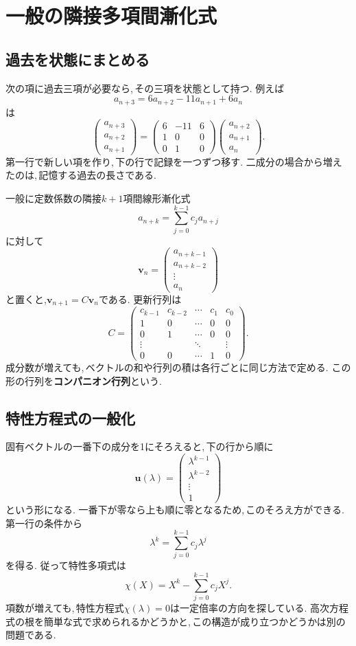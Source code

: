 \section{一般の隣接多項間漸化式}\label{節：一般の隣接多項間漸化式}
\subsection{過去を状態にまとめる}

次の項に過去三項が必要なら,\,その三項を状態として持つ.
例えば
\[
 a_{n+3}=6a_{n+2}-11a_{n+1}+6a_n
\]
は
\[
 \begin{pmatrix}a_{n+3}\\a_{n+2}\\a_{n+1}\end{pmatrix}
 =
 \begin{pmatrix}6&-11&6\\1&0&0\\0&1&0\end{pmatrix}
 \begin{pmatrix}a_{n+2}\\a_{n+1}\\a_n\end{pmatrix}.
\]
第一行で新しい項を作り,\,下の行で記録を一つずつ移す.
二成分の場合から増えたのは,\,記憶する過去の長さである.

一般に定数係数の隣接$k+1$項間線形漸化式
\[
 a_{n+k}=\sum_{j=0}^{k-1}c_j a_{n+j}
\]
に対して
\[
 \boldsymbol v_n=
 \begin{pmatrix}a_{n+k-1}\\a_{n+k-2}\\\vdots\\a_n\end{pmatrix}
\]
と置くと,$\boldsymbol v_{n+1}=C\boldsymbol v_n$である.
更新行列は
\[
 C=
 \begin{pmatrix}
 c_{k-1}&c_{k-2}&\cdots&c_1&c_0\\
 1&0&\cdots&0&0\\
 0&1&\cdots&0&0\\
 \vdots&&\ddots&&\vdots\\
 0&0&\cdots&1&0
 \end{pmatrix}.
\]
成分数が増えても,\,ベクトルの和や行列の積は各行ごとに同じ方法で定める.
この形の行列を\textbf{コンパニオン行列}という.

\subsection{特性方程式の一般化}

固有ベクトルの一番下の成分を1にそろえると,\,下の行から順に
\[
 \boldsymbol u(\lambda)=
 \begin{pmatrix}\lambda^{k-1}\\\lambda^{k-2}\\\vdots\\1\end{pmatrix}
\]
という形になる.
一番下が零なら上も順に零となるため,\,このそろえ方ができる.
第一行の条件から
\[
 \lambda^k=\sum_{j=0}^{k-1}c_j\lambda^j
\]
を得る. 従って特性多項式は
\[
 \chi(X)=X^k-\sum_{j=0}^{k-1}c_jX^j.
\]
項数が増えても,\,特性方程式$\chi(\lambda)=0$は一定倍率の方向を探している.
高次方程式の根を簡単な式で求められるかどうかと,\,この構造が成り立つかどうかは別の問題である.

